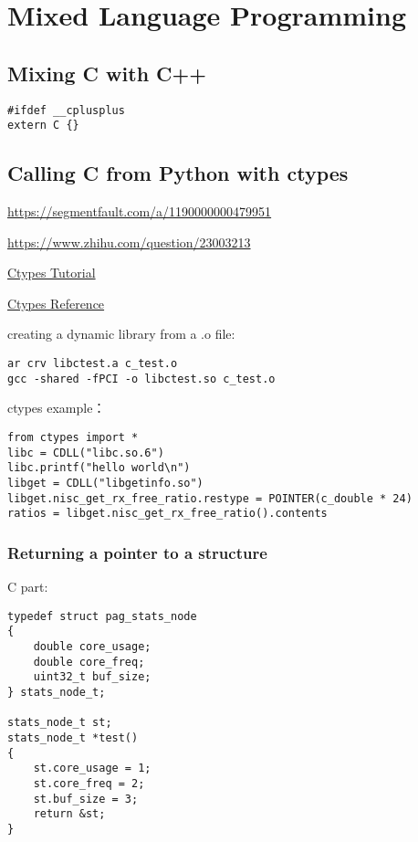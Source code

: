 
\section{Mixed Language Programming}
\subsection{Mixing C with C++}
\begin{verbatim}
#ifdef __cplusplus
extern C {}
\end{verbatim}

\subsection{Calling C from Python with ctypes}

\url{https://segmentfault.com/a/1190000000479951}

\url{https://www.zhihu.com/question/23003213}

\href{https://docs.python.org/2/library/ctypes.html##ctypes-tutorial}{Ctypes Tutorial}

\href{https://docs.python.org/2/library/ctypes.html#ctypes-reference}{Ctypes Reference}

 
 creating a dynamic library from a .o file:

\begin{verbatim}
ar crv libctest.a c_test.o
gcc -shared -fPCI -o libctest.so c_test.o
\end{verbatim}

ctypes example：
\begin{verbatim}
from ctypes import *
libc = CDLL("libc.so.6")
libc.printf("hello world\n")
libget = CDLL("libgetinfo.so")
libget.nisc_get_rx_free_ratio.restype = POINTER(c_double * 24) 
ratios = libget.nisc_get_rx_free_ratio().contents
\end{verbatim}

\subsubsection{Returning a pointer to a structure}

C part:
\begin{verbatim}
typedef struct pag_stats_node
{
	double core_usage;
	double core_freq;
	uint32_t buf_size;
} stats_node_t;

stats_node_t st;
stats_node_t *test()
{
	st.core_usage = 1;
	st.core_freq = 2;
	st.buf_size = 3;
	return &st;
}
\end{verbatim}

